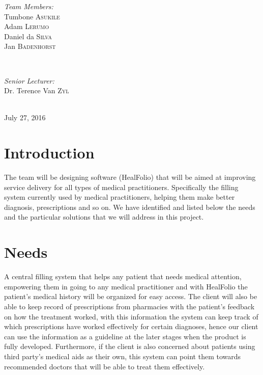 \documentclass[a4paper]{article}
\begin{document}
\begin{titlepage}
\begin{minipage}{0.4\textwidth}
\begin{flushleft}
\emph{Team Members:} \\[0.3cm]

Tumbone \textsc{Asukile} \\
Adam \textsc{Lerumo} \\
Daniel da \textsc{Silva} \\
Jan \textsc{Badenhorst} \\

\end{flushleft}

\end{minipage} \\[0.7cm]

\begin{minipage}{0.4\textwidth}

\begin{flushright} \large

\emph{Senior Lecturer:} \\[0.3cm]

Dr. Terence Van \textsc{Zyl}

\end{flushright}

\end{minipage} \\[1cm]

{\large July 27, 2016} 
    
\end{titlepage}

\section*{Introduction}

\setlength\parindent{24pt}

The team will be designing software (HealFolio) that will be aimed at improving service delivery for all types of medical practitioners. Specifically the filling system currently used by medical practitioners, helping them make better diagnosis, prescriptions and so on. We have identified and listed below the needs and the particular solutions that we will address in this project.

\section*{Needs}

A central filling system that helps any patient that needs medical attention, empowering them in going to any medical practitioner and with HealFolio the patient’s medical history will be organized for easy access. The client will also be able to keep record of prescriptions from pharmacies with the patient’s feedback on how the treatment worked, with this information the system can keep track of which prescriptions have worked effectively for certain diagnoses, hence our client can use the information as a guideline at the later stages when the product is fully developed. Furthermore, if the client is also concerned about patients using third party’s medical aids as their own, this system can point them towards recommended doctors that will be able to treat them effectively.
\end{document}
